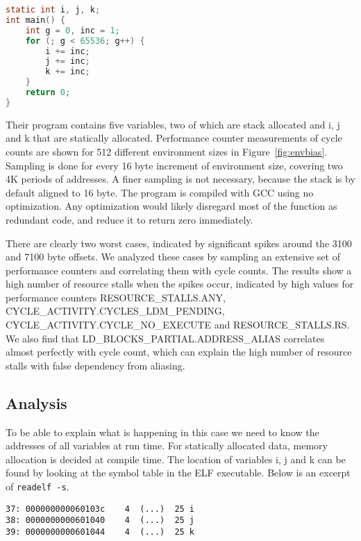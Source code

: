 \documentclass[a4paper,10pt,twocolumn,twoside]{article}
\begin{document}
\begin{lstlisting}[float=h, language=C, caption={Microkernel succeptible to aliasing between static variables and automatic variables for certain environment sizes}, label={lst:loopkernel}, frame=lines]
static int i, j, k;
int main() {
    int g = 0, inc = 1;
    for (; g < 65536; g++) {
        i += inc;
        j += inc;
        k += inc; 
    }
    return 0;
}
\end{lstlisting}

Their program contains five variables, two of which are stack allocated and i, j and k that are statically allocated.
Performance counter measurements of cycle counts are shown for 512 different environment sizes in Figure~\ref{fig:envbias}.
Sampling is done for every 16 byte increment of environment size, covering two 4K periods of addresses.
A finer sampling is not necessary, because the stack is by default aligned to 16 byte.
The program is compiled with GCC using no optimization.
Any optimization would likely disregard most of the function as redundant code, and reduce it to return zero immediately.

There are clearly two worst cases, indicated by significant spikes around the 3100 and 7100 byte offsets.
We analyzed these cases by sampling an extensive set of performance counters and correlating them with cycle counts.
The results show a high number of resource stalls when the spikes occur, indicated by high values for performance counters \small{RESOURCE\_STALLS.ANY}, \small{CYCLE\_ACTIVITY.CYCLES\_LDM\_PENDING}, \small{CYCLE\_ACTIVITY.CYCLE\_NO\_EXECUTE} and \small{RESOURCE\_STALLS.RS}.
We also find that \small{LD\_BLOCKS\_PARTIAL.ADDRESS\_ALIAS} correlates almost perfectly with cycle count, which can explain the high number of resource stalls with false dependency from aliasing.

\subsection{Analysis}
To be able to explain what is happening in this case we need to know the addresses of all variables at run time.
For statically allocated data, memory allocation is decided at compile time.
The location of variables i, j and k can be found by looking at the symbol table in the ELF executable.
Below is an excerpt of \lstinline$readelf -s$.
\begin{lstlisting}[float=h, basicstyle=\small]
37: 000000000060103c    4  (...)  25 i
38: 0000000000601040    4  (...)  25 j
39: 0000000000601044    4  (...)  25 k
\end{lstlisting}
\end{document}
